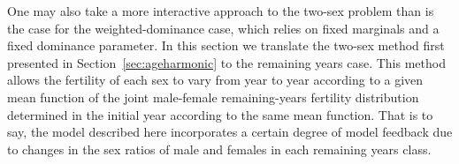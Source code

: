 
One may also take a more interactive approach to the two-sex
problem than is the case for the weighted-dominance case, which relies
on fixed marginals and a fixed dominance parameter. In this section we
translate the two-sex method first presented in Section~\ref{sec:ageharmonic}
to the remaining years case. This method allows the fertility of each sex to
vary from year to year according to a given mean function of the joint male-female remaining-years 
fertility distribution determined in the initial year according to the same
mean function. That is to say, the model described here incorporates a certain
degree of model feedback due to changes in the sex ratios of male and females in
each remaining years class.


